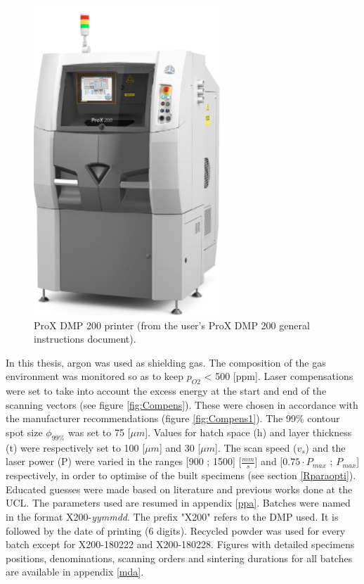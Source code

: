 \begin{figure}[ht]
\centering
\includegraphics[scale=0.7]{Images/Printer}
\decoRule
\caption[ProX DMP 200 printer]{ProX DMP 200 printer (from the user's ProX DMP 200 general instructions document).}
\label{fig:Printer}
\end{figure}

In this thesis, argon was used as shielding gas. The composition of the gas environment was monitored so as to keep $p_{O2}$ < 500 [ppm]. Laser compensations were set to take into account the excess energy at the start and end of the scanning vectors (see figure \ref{fig:Compens}). These were chosen in accordance with the manufacturer recommendations (figure \ref{fig:Compens1}). The 99\% contour spot size $\phi_{99\%}$ was set to 75 [$\mu m$]. Values for hatch space (h) and layer thickness (t) were respectively set to 100 [$\mu m$] and 30 [$\mu m$]. The scan speed ($v_s$) and the laser power (P) were varied in the ranges [900 ; 1500] [$\frac{mm}{s}$] and [$0.75 \cdot P_{max}$ ; $P_{max}$] respectively, in order to optimise of the built specimens (see section \ref{Rparaopti}). Educated guesses were made based on literature and previous works done at the UCL. The parameters used are resumed in appendix \ref{ppa}. Batches were named in the format X200-\textit{yymmdd}. The prefix "X200" refers to the DMP used. It is followed by the date of printing (6 digits). Recycled powder was used for every batch except for X200-180222 and X200-180228. Figures with detailed specimens positions, denominations, scanning orders and sintering durations for all batches are available in appendix \ref{mda}.\\

